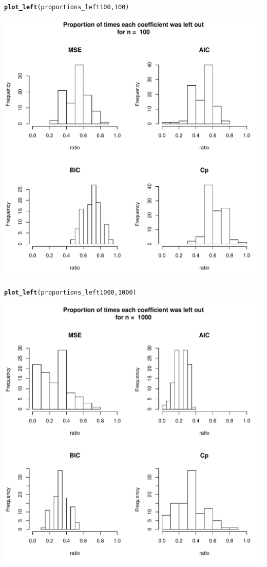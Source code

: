 \documentclass[11pt]{article}\usepackage[]{graphicx}\usepackage[]{color}
\makeatletter
\def\maxwidth{ %
  \ifdim\Gin@nat@width>\linewidth
    \linewidth
  \else
    \Gin@nat@width
  \fi
}
\newcommand{\hlnum}[1]{\textcolor[rgb]{0.686,0.059,0.569}{#1}}%
\newcommand{\hlstd}[1]{\textcolor[rgb]{0.345,0.345,0.345}{#1}}%
\newcommand{\hlkwd}[1]{\textcolor[rgb]{0.737,0.353,0.396}{\textbf{#1}}}%
\newenvironment{kframe}{%
 \def\at@end@of@kframe{}%
 \ifinner\ifhmode%
  \def\at@end@of@kframe{\end{minipage}}%
  \begin{minipage}{\columnwidth}%
 \fi\fi%
 \def\FrameCommand##1{\hskip\@totalleftmargin \hskip-\fboxsep
 \colorbox{shadecolor}{##1}\hskip-\fboxsep
     \hskip-\linewidth \hskip-\@totalleftmargin \hskip\columnwidth}%
 \MakeFramed {\advance\hsize-\width
   \@totalleftmargin\z@ \linewidth\hsize
   \@setminipage}}%
 {\par\unskip\endMakeFramed%
 \at@end@of@kframe}
\newenvironment{knitrout}{}{} %
\makeatother
\begin{document}
\begin{knitrout}
\begin{kframe}
\begin{alltt}
\hlkwd{plot_left}\hlstd{(proportions_left100,}\hlnum{100}\hlstd{)}
\end{alltt}
\end{kframe}
\includegraphics[width=\maxwidth]{figure/unnamed-chunk-7-3} 
\begin{kframe}\begin{alltt}
\hlkwd{plot_left}\hlstd{(proportions_left1000,}\hlnum{1000}\hlstd{)}
\end{alltt}
\end{kframe}
\includegraphics[width=\maxwidth]{figure/unnamed-chunk-7-4} 

\end{knitrout}
\end{document}
